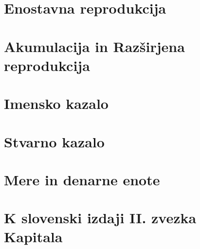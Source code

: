 \documentclass[egregdoesnotlikesansseriftitles]{scrbook}
\begin{document}
    \chapter{Enostavna reprodukcija}

    \chapter{Akumulacija in Razširjena reprodukcija}

\chapter{Imensko kazalo}

\chapter{Stvarno kazalo}

\chapter{Mere in denarne enote}

\chapter{K slovenski izdaji II. zvezka Kapitala}
\end{document}
